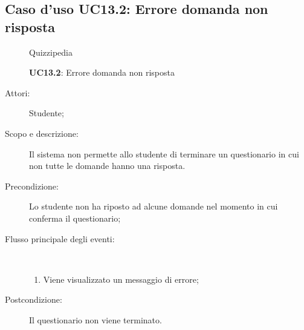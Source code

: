 \subsection{Caso d'uso UC13.2: Errore domanda non risposta}
	\begin{figure}[H]
		\centering
		\begin{resizedtikzpicture}{\textwidth}
		\begin{umlsystem}[x=0, fill=lightgray!20]{Quizzipedia}
		\end{umlsystem}
		\end{resizedtikzpicture}
		\caption{\textbf{UC13.2}: Errore domanda non risposta}
		\label{UC13.2}
	\end{figure}
\begin{description}
\item[Attori:] Studente;
\item[Scopo e descrizione:] Il sistema non permette allo studente di terminare un questionario in cui non tutte le domande hanno una risposta.
      \item[Precondizione:] Lo studente non ha riposto ad alcune domande nel momento in cui conferma il questionario;

        \item[Flusso principale degli eventi:] \ 
 \begin{enumerate}
          \item Viene visualizzato un messaggio di errore;

      \end{enumerate}
    \item[Postcondizione:] Il questionario non viene terminato.
  \end{description}
\hypertarget{UC13.3}{}
